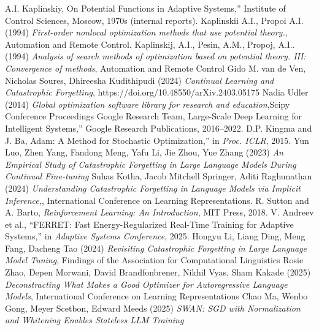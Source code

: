 \documentclass[12pt]{article}
\begin{document}
 \begin{thebibliography}{9}

 A.I. Kaplinskiy, On Potential Functions in Adaptive Systems,'' Institute of Control Sciences, Moscow, 1970s (internal reports).
Kaplinskii A.I., Propoi A.I. (1994) \emph{First-order nonlocal optimization methods that use potential theory.}, Automation and Remote Control. 
Kaplinskij, A.I., Pesin, A.M., Propoj, A.I.. (1994) \emph{  Analysis of search methods of optimization based on potential theory. III: Convergence of methods}, Automation and Remote Control
Gido M. van de Ven, Nicholas Soures, Dhireesha Kudithipudi (2024)  \emph{  Continual Learning and Catastrophic Forgetting},
https://doi.org/10.48550/arXiv.2403.05175
Nadia Udler (2014) \emph{ Global optimization software library for research and education},Scipy Conference Proceedings
 Google Research Team, Large-Scale Deep Learning for Intelligent Systems,'' Google Research Publications, 2016--2022.
 D.P. Kingma and J. Ba, Adam: A Method for Stochastic Optimization,'' in \emph{Proc. ICLR}, 2015.
 Yun Luo, Zhen Yang, Fandong Meng, Yafu Li, Jie Zhou, Yue Zhang (2023) \emph{An Empirical Study of Catastrophic Forgetting in Large Language Models During Continual Fine-tuning}
  Suhas Kotha, Jacob Mitchell Springer, Aditi Raghunathan (2024) \emph{Understanding Catastrophic Forgetting in Language Models via Implicit Inference,},  International Conference on Learning Representations.
 R. Sutton and A. Barto, \emph{Reinforcement Learning: An Introduction}, MIT Press, 2018.
 V. Andreev et al., ``FERRET: Fast Energy-Regularized Real-Time Training for Adaptive Systems,'' in \emph{Adaptive Systems Conference}, 2025.
 Hongyu Li, Liang Ding, Meng Fang, Dacheng Tao  (2024)  \emph{ Revisiting Catastrophic Forgetting in Large Language Model Tuning}, Findings of the Association for Computational Linguistics
 Rosie Zhao, Depen Morwani, David Brandfonbrener, Nikhil Vyas, Sham Kakade (2025) \emph{Deconstracting What Makes a Good Optimizer for Autoregressive Language Models}, International Conference on Learning Representations
 Chao Ma, Wenbo Gong, Meyer Scetbon, Edward Meeds (2025) \emph{SWAN: SGD with Normalization and Whitening Enables Stateless LLM Training}


\end{thebibliography}
\end{document}
